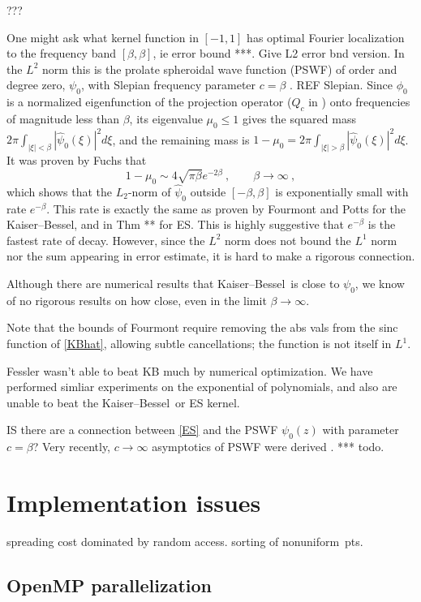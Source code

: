 \documentclass[10pt]{article}
\newcommand{\be}{\begin{equation}}
\newcommand{\ee}{\end{equation}}
\newcommand{\NU}{{nonuniform}}
\newcommand{\KB}{Kaiser--Bessel}
\newcommand{\freq}{\beta}          %
\begin{document}
???

One might ask what kernel function in $[-1,1]$ has optimal Fourier localization
to the frequency band $[\freq,\freq]$,
ie error bound ***.
Give L2 error bnd version.
In the $L^2$ norm this is the prolate spheroidal wave function (PSWF)
of order and degree zero, $\psi_0$,
with Slepian frequency parameter $c=\freq$
\cite{osipov}. REF Slepian.
Since $\phi_0$ is a normalized eigenfunction of the projection operator
($Q_c$ in \cite{osipov}) onto frequencies
of magnitude less than $\freq$,
its eigenvalue $\mu_0\le 1$ gives the
squared mass
$2\pi \int_{|\xi|<\freq}|\hat\psi_0(\xi)|^2 d\xi$,
and the remaining mass is
$1-\mu_0 =2\pi \int_{|\xi|>\freq}|\hat\psi_0(\xi)|^2 d\xi$.
It was proven by Fuchs \cite{fuchs} that
\be
1 - \mu_0 \sim 4\sqrt{\pi\freq} e^{-2\freq} ~, \qquad \freq\to\infty~,
\label{fuchs}
\ee
which shows that the $L_2$-norm of $\hat\psi_0$ outside
$[-\freq,\freq]$ is exponentially small with rate $e^{-\freq}$.
This rate is exactly the same as
proven by Fourmont and Potts for the \KB, and in Thm ** for ES.
This is highly suggestive that $e^{-\freq}$ is the fastest
rate of decay.
However, since the $L^2$ norm does not bound the $L^1$ norm
nor the sum appearing in error estimate,
it is hard to make a rigorous connection.

Although there are numerical results that \KB\ is close to $\psi_0$,
we know of no rigorous results on how close, even in the limit
$\freq \to\infty$.

Note that the bounds of Fourmont require removing the abs vals
from the sinc function of \eqref{KBhat}, allowing subtle cancellations;
the function is not itself in $L^1$.

Fessler wasn't able to beat KB much by numerical optimization.
We have performed simliar experiments on the
exponential of polynomials, and also are unable to beat the \KB\ or
ES kernel.

IS there are a connection between \eqref{ES} and the PSWF $\psi_0(z)$
with parameter $c=\freq$?
Very recently, $c\to\infty$ asymptotics of PSWF were derived
\cite{dunster}.
*** todo.


\section{Implementation issues}

spreading cost dominated by random access.
sorting of \NU\ pts.

\subsection{OpenMP parallelization}
\end{document}
